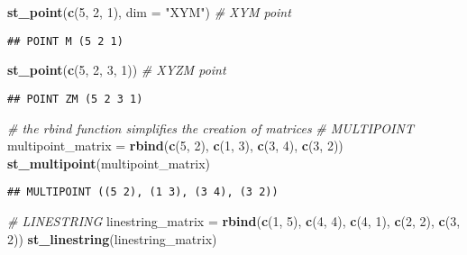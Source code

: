 \documentclass[]{article}
\newenvironment{Shaded}{\begin{snugshade}}{\end{snugshade}}
\newcommand{\CommentTok}[1]{\textcolor[rgb]{0.56,0.35,0.01}{\textit{#1}}}
\newcommand{\DataTypeTok}[1]{\textcolor[rgb]{0.13,0.29,0.53}{#1}}
\newcommand{\DecValTok}[1]{\textcolor[rgb]{0.00,0.00,0.81}{#1}}
\newcommand{\KeywordTok}[1]{\textcolor[rgb]{0.13,0.29,0.53}{\textbf{#1}}}
\newcommand{\NormalTok}[1]{#1}
\newcommand{\StringTok}[1]{\textcolor[rgb]{0.31,0.60,0.02}{#1}}
\begin{document}
\begin{Shaded}
\begin{Highlighting}[]
\KeywordTok{st_point}\NormalTok{(}\KeywordTok{c}\NormalTok{(}\DecValTok{5}\NormalTok{, }\DecValTok{2}\NormalTok{, }\DecValTok{1}\NormalTok{), }\DataTypeTok{dim =} \StringTok{"XYM"}\NormalTok{) }\CommentTok{# XYM point}
\end{Highlighting}
\end{Shaded}

\begin{verbatim}
## POINT M (5 2 1)
\end{verbatim}

\begin{Shaded}
\begin{Highlighting}[]
\KeywordTok{st_point}\NormalTok{(}\KeywordTok{c}\NormalTok{(}\DecValTok{5}\NormalTok{, }\DecValTok{2}\NormalTok{, }\DecValTok{3}\NormalTok{, }\DecValTok{1}\NormalTok{))           }\CommentTok{# XYZM point}
\end{Highlighting}
\end{Shaded}

\begin{verbatim}
## POINT ZM (5 2 3 1)
\end{verbatim}

\begin{Shaded}
\begin{Highlighting}[]
\CommentTok{# the rbind function simplifies the creation of matrices}
\CommentTok{# MULTIPOINT}
\NormalTok{multipoint_matrix =}\StringTok{ }\KeywordTok{rbind}\NormalTok{(}\KeywordTok{c}\NormalTok{(}\DecValTok{5}\NormalTok{, }\DecValTok{2}\NormalTok{), }\KeywordTok{c}\NormalTok{(}\DecValTok{1}\NormalTok{, }\DecValTok{3}\NormalTok{), }\KeywordTok{c}\NormalTok{(}\DecValTok{3}\NormalTok{, }\DecValTok{4}\NormalTok{), }\KeywordTok{c}\NormalTok{(}\DecValTok{3}\NormalTok{, }\DecValTok{2}\NormalTok{))}
\KeywordTok{st_multipoint}\NormalTok{(multipoint_matrix)}
\end{Highlighting}
\end{Shaded}

\begin{verbatim}
## MULTIPOINT ((5 2), (1 3), (3 4), (3 2))
\end{verbatim}

\begin{Shaded}
\begin{Highlighting}[]
\CommentTok{# LINESTRING}
\NormalTok{linestring_matrix =}\StringTok{ }\KeywordTok{rbind}\NormalTok{(}\KeywordTok{c}\NormalTok{(}\DecValTok{1}\NormalTok{, }\DecValTok{5}\NormalTok{), }\KeywordTok{c}\NormalTok{(}\DecValTok{4}\NormalTok{, }\DecValTok{4}\NormalTok{), }\KeywordTok{c}\NormalTok{(}\DecValTok{4}\NormalTok{, }\DecValTok{1}\NormalTok{), }\KeywordTok{c}\NormalTok{(}\DecValTok{2}\NormalTok{, }\DecValTok{2}\NormalTok{), }\KeywordTok{c}\NormalTok{(}\DecValTok{3}\NormalTok{, }\DecValTok{2}\NormalTok{))}
\KeywordTok{st_linestring}\NormalTok{(linestring_matrix)}
\end{Highlighting}
\end{Shaded}
\end{document}
